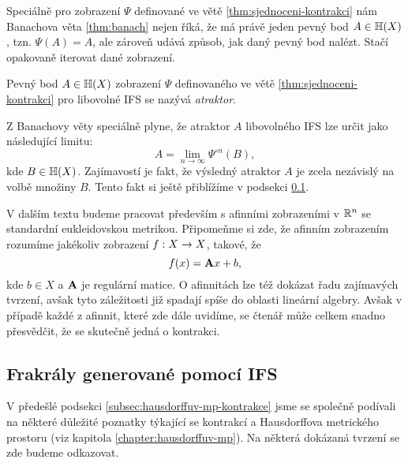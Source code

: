 Speciálně pro zobrazení $\Psi$ definované ve větě \ref{thm:sjednoceni-kontrakci} nám Banachova věta \ref{thm:banach} nejen říká, že má právě jeden pevný bod $A\in\mathbb{H}(X)$, tzn. $\Psi(A)=A$, ale zároveň udává způsob, jak daný pevný bod nalézt. Stačí opakovaně iterovat dané zobrazení.
\begin{definition}[Atraktor]\label{def:atraktor}
    Pevný bod $A\in\mathbb{H}(X)$ zobrazení $\Psi$ definovaného ve větě \ref{thm:sjednoceni-kontrakci} pro libovolné IFS se nazývá \emph{atraktor}.
\end{definition}
Z Banachovy věty speciálně plyne, že atraktor $A$ libovolného IFS lze určit jako následující limitu:
\[A=\lim_{n\to\infty}\Psi^{\circ n}(B),\]
kde $B\in\mathbb{H}(X)$. Zajímavostí je fakt, že výsledný atraktor $A$ je zcela nezávislý na volbě množiny $B$. Tento fakt si ještě přiblížíme v podsekci \ref{subsec:fraktaly-ifs}.

V dalším textu budeme pracovat především s afinními zobrazeními v $\mathbb{R}^n$ se standardní eukleidovskou metrikou. Připomeňme si zde, že afinním zobrazením rozumíme jakékoliv zobrazení $f:X \rightarrow X$, takové, že
\[f(x)=\mathbf{A}x+b,\]
kde $b\in X$ a $\mathbf{A}$ je regulární matice. O afinnitách lze též dokázat řadu zajímavých tvrzení, avšak tyto záležitosti již spadají spíše do oblasti lineární algebry. Avšak v případě každé z afinnit, které zde dále uvidíme, se čtenář může celkem snadno přesvědčit, že se skutečně jedná o kontrakci.

\subsection{Frakrály generované pomocí IFS}\label{subsec:fraktaly-ifs}

V předešlé podsekci \ref{subsec:hausdorffuv-mp-kontrakce} jsme se společně podívali na některé důležité poznatky týkající se kontrakcí a Hausdorffova metrického prostoru (viz kapitola \ref{chapter:hausdorffuv-mp}). Na některá dokázaná tvrzení se zde budeme odkazovat.


